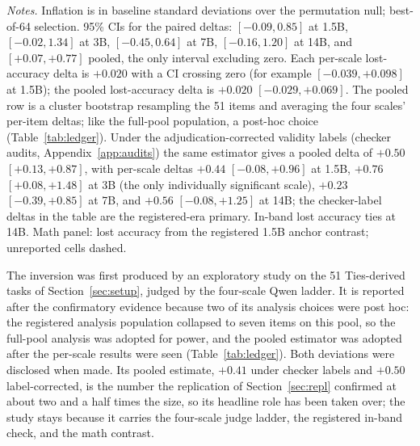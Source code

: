 \documentclass[11pt]{article}
\begin{document}
\begin{table}[tbp]
\medskip
\begin{minipage}{0.97\textwidth}
\footnotesize
\emph{Notes.}
Inflation is in baseline standard deviations over the permutation null; best-of-64 selection.
95\% CIs for the paired deltas: $[-0.09, 0.85]$ at 1.5B, $[-0.02, 1.34]$ at 3B, $[-0.45, 0.64]$ at 7B, $[-0.16, 1.20]$ at 14B, and $[+0.07, +0.77]$ pooled, the only interval excluding zero.
Each per-scale lost-accuracy delta is $+0.020$ with a CI crossing zero (for example $[-0.039, +0.098]$ at 1.5B); the pooled lost-accuracy delta is $+0.020$ $[-0.029, +0.069]$.
The pooled row is a cluster bootstrap resampling the 51 items and averaging the four scales' per-item deltas; like the full-pool population, a post-hoc choice (Table~\ref{tab:ledger}).
Under the adjudication-corrected validity labels (checker audits, Appendix~\ref{app:audits}) the same estimator gives a pooled delta of $+0.50$ $[+0.13, +0.87]$, with per-scale deltas $+0.44$ $[-0.08, +0.96]$ at 1.5B, $+0.76$ $[+0.08, +1.48]$ at 3B (the only individually significant scale), $+0.23$ $[-0.39, +0.85]$ at 7B, and $+0.56$ $[-0.08, +1.25]$ at 14B; the checker-label deltas in the table are the registered-era primary.
In-band lost accuracy ties at 14B.
Math panel: lost accuracy from the registered 1.5B anchor contrast; unreported cells dashed.
\end{minipage}
\caption{\textbf{Takeaway: on multi-valid tasks, adding the reference never helps, directionally hurts on every row, and the pooled inflation delta excludes zero, while the identical math protocol shows the reference collapsing inflation $4$--$13\times$.}
Exploratory Ties study, best-of-64 selection at four Qwen2.5 judge scales, in three panels: the post-hoc full pool ($n{=}51$ items), the registered in-band subset ($n{=}7$), and the unique-answer math contrast.
Higher is worse in every column.}
\label{tab:fullset}
\end{table}

The inversion was first produced by an exploratory study on the 51 Ties-derived tasks of Section~\ref{sec:setup}, judged by the four-scale Qwen ladder.
It is reported after the confirmatory evidence because two of its analysis choices were post hoc: the registered analysis population collapsed to seven items on this pool, so the full-pool analysis was adopted for power, and the pooled estimator was adopted after the per-scale results were seen (Table~\ref{tab:ledger}).
Both deviations were disclosed when made.
Its pooled estimate, $+0.41$ under checker labels and $+0.50$ label-corrected, is the number the replication of Section~\ref{sec:repl} confirmed at about two and a half times the size, so its headline role has been taken over; the study stays because it carries the four-scale judge ladder, the registered in-band check, and the math contrast.
\end{document}
